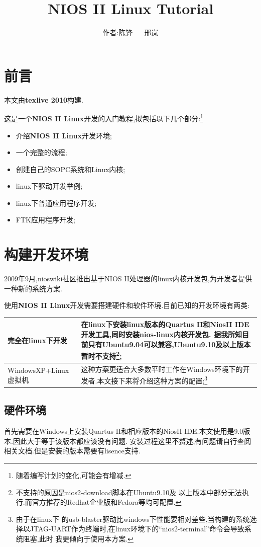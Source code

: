 \documentclass[12pt,a4paper,titlepage]{article}
\title{NIOS II Linux Tutorial}
\author{作者:陈锋 \ {}\ {} 邢岚}
\begin{document}
\thispagestyle{empty}
\maketitle{}
\section{前言}
本文由\textbf{texlive 2010}构建.

这是一个\textbf{NIOS II Linux}开发的入门教程,拟包括以下几个部分:\footnote{随着编写计划的变化,可能会有增减.}
\begin{itemize}
\item 介绍\textbf{NIOS II Linux}开发环境;
\item 一个完整的流程;
\item 创建自己的SOPC系统和Linux内核;
\item linux下驱动开发举例;
\item linux下普通应用程序开发;
\item FTK应用程序开发;
\end{itemize}
\newpage{}
\section{构建开发环境}
2009年9月,nioswiki社区推出基于NIOS II处理器的linux内核开发包,为开发者提供一种新的系统方案.

使用\textbf{NIOS II Linux}开发需要搭建硬件和软件环境.目前已知的开发环境有两类:
\begin{table}[!hbtp]
\centering
\begin{tabular}{|l|p{}|}
\hline
完全在linux下开发 & 在linux下安装linux版本的Quartus II和NiosII IDE开发工具,同时安装nios-linux内核开发包.
据我所知目前只有\textbf{Ubuntu9.04}可以兼容,Ubuntu9.10及以上版本暂时不支持\footnote{不支持的原因是nios2-download脚本在Ubuntu9.10及
以上版本中部分无法执行.而官方推荐的Redhat企业版和Fedora等均可配置.};\\
\hline
WindowsXP+Linux虚拟机 & 这种方案更适合大多数平时工作在Windows环境下的开发者.本文接下来将介绍这种方案的配置;\footnote{由于在linux下
的usb-blaster驱动比windows下性能要相对差些,当构建的系统选择以JTAG-UART作为终端时,在linux环境下的``nios2-terminal''命令会导致系统阻塞,此时
我更倾向于使用本方案.} \\
\hline
\end{tabular}
\end{table}
\subsection{硬件环境}
首先需要在Windows上安装Quartus II和相应版本的NiosII IDE.本文使用是9.0版本.因此大于等于该版本都应该没有问题.
安装过程这里不赘述,有问题请自行查阅相关文档.但是安装的版本{需要有lisence支持}.
\end{document}
